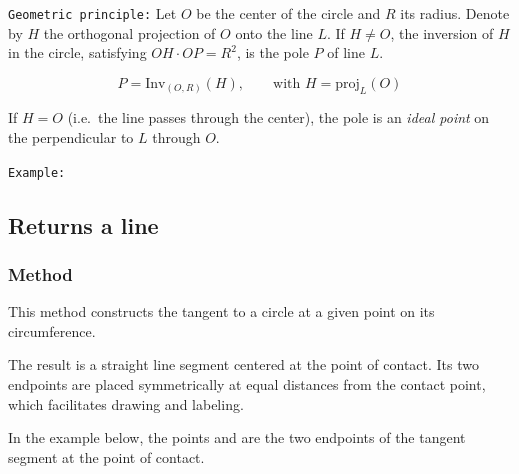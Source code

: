 \medskip
\texttt{Geometric principle:}
Let \(O\) be the center of the circle and \(R\) its radius.
Denote by \(H\) the orthogonal projection of \(O\) onto the line \(L\).
If \(H \neq O\), the inversion of \(H\) in the circle,
satisfying \(OH \cdot OP = R^2\),
is the pole \(P\) of line \(L\).

\[
P = \mathrm{Inv}_{(O,R)}(H),
\qquad \text{with } H = \mathrm{proj}_L(O)
\]

If \(H = O\) (i.e.\ the line passes through the center),
the pole is an \emph{ideal point} on the perpendicular to \(L\) through \(O\).



\medskip
\texttt{Example:}

\begin{center}
 \end{center}



\subsection{Returns a line}

\subsubsection{Method }
\label{ssub:method_circle_tangent__at_pt}

This method constructs the tangent to a circle at a given point on its circumference.

\medskip

The result is a straight line segment centered at the point of contact. Its two endpoints are placed symmetrically at equal distances from the contact point, which facilitates drawing and labeling.

\medskip

In the example below, the points  and  are the two endpoints of the tangent segment at the point of contact.


